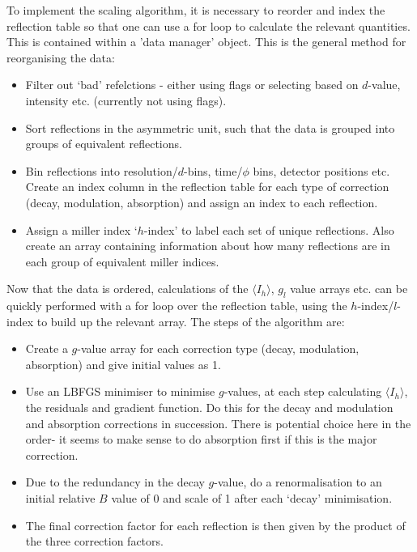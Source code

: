 \documentclass[11pt, oneside]{article}   	%
\begin{document}
To implement the scaling algorithm, it is necessary to reorder and index the reflection table so that one can use a for loop to calculate the relevant quantities. This is contained within a 'data manager' object. This is the general method for reorganising the data:
\begin{itemize}
\item{Filter out `bad' refelctions - either using flags or selecting based on $d$-value, intensity etc. (currently not using flags).}
\item{Sort reflections in the asymmetric unit, such that the data is grouped into groups of equivalent reflections.}
\item{Bin reflections into resolution/$d$-bins, time/$\phi$ bins, detector positions etc. Create an index column in the reflection table for each type of correction (decay, modulation, absorption) and assign an index to each reflection. }
\item{Assign a miller index `$h$-index' to label each set of unique reflections. Also create an array containing information about how many reflections are in each group of equivalent miller indices.}
\end{itemize}

Now that the data is ordered, calculations of the $\langle I_h \rangle$, $g_l$ value arrays etc. can be quickly performed with a for loop over the reflection table, using the $h$-index/$l$-index to build up the relevant array. The steps of the algorithm are:
\begin{itemize}
\item{Create a $g$-value array for each correction type (decay, modulation, absorption) and give initial values as 1.}
\item{Use an LBFGS minimiser to minimise $g$-values, at each step calculating $\langle I_h \rangle$, the residuals and gradient function. Do this for the decay and modulation and absorption corrections in succession. {\color{red} There is potential choice here in the order- it seems to make sense to do absorption first if this is the major correction.}}
\item{Due to the redundancy in the decay $g$-value, do a renormalisation to an initial relative $B$ value of 0 and scale of 1 after each `decay' minimisation.}
\item{The final correction factor for each reflection is then given by the product of the three correction factors.}
\end{itemize}
\end{document}
